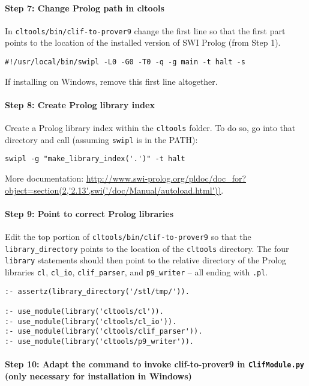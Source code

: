 \documentclass{article}
\begin{document}
\paragraph{Step 7: Change Prolog path in cltools}

In \texttt{cltools/bin/clif-to-prover9} change the first line so that the first part points to the location of the installed version of SWI Prolog (from Step 1). 

\begin{verbatim}
#!/usr/local/bin/swipl -L0 -G0 -T0 -q -g main -t halt -s
\end{verbatim}

If installing on Windows, remove this first line altogether.

\paragraph{Step 8: Create Prolog library index}

Create a Prolog library index within the \texttt{cltools} folder. To do so, go into that directory and call (assuming \texttt{swipl} is in the PATH):
\begin{verbatim}
swipl -g "make_library_index('.')" -t halt
\end{verbatim}
More documentation: \url{http://www.swi-prolog.org/pldoc/doc_for?object=section(2,'2.13',swi('/doc/Manual/autoload.html'))}.

\paragraph{Step 9: Point to correct Prolog libraries}

Edit the top portion of \texttt{cltools/bin/\allowbreak clif-to-prover9} so that the \texttt{library\_directory} points to the location of the \texttt{cltools} directory.  The four \texttt{library} statements should then point to the relative directory of the Prolog libraries \texttt{cl}, \texttt{cl\_io}, \texttt{clif\_parser}, and \texttt{p9\_writer} -- all ending with \texttt{.pl}.

\begin{verbatim}
:- assertz(library_directory('/stl/tmp/')).

:- use_module(library('cltools/cl')).
:- use_module(library('cltools/cl_io')).
:- use_module(library('cltools/clif_parser')).
:- use_module(library('cltools/p9_writer')).
\end{verbatim}


\paragraph{Step 10: Adapt the command to invoke clif-to-prover9 in \texttt{ClifModule.py} (only necessary for installation in Windows)}
\end{document}
